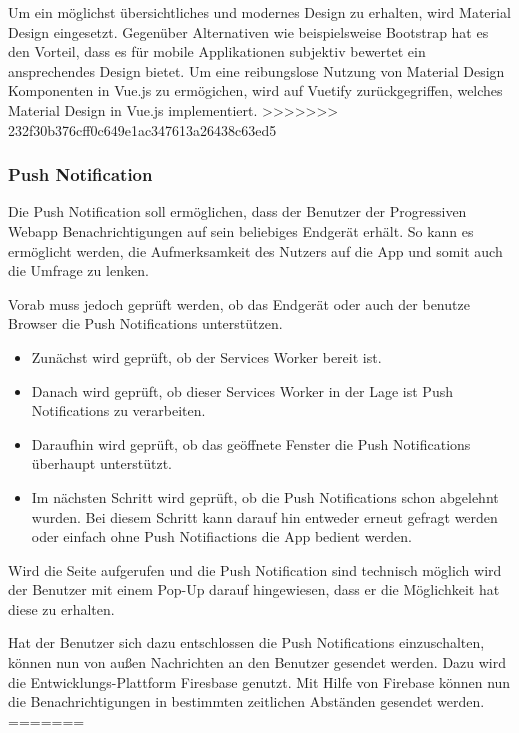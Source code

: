 Um ein möglichst übersichtliches und modernes Design zu erhalten, wird Material Design eingesetzt. Gegenüber Alternativen wie beispielsweise Bootstrap hat es den Vorteil, dass es für mobile Applikationen subjektiv bewertet ein ansprechendes Design bietet. Um eine reibungslose Nutzung von Material Design Komponenten in Vue.js zu ermögichen, wird auf Vuetify zurückgegriffen, welches Material Design in Vue.js implementiert.
>>>>>>> 232f30b376cff0c649e1ac347613a26438c63ed5


\subsubsection{Push Notification}
Die Push Notification soll ermöglichen, dass der Benutzer der Progressiven Webapp Benachrichtigungen auf sein beliebiges Endgerät erhält. So kann es ermöglicht werden, die Aufmerksamkeit des Nutzers auf die App und somit auch die Umfrage zu lenken. 

Vorab muss jedoch geprüft werden, ob das Endgerät oder auch der benutze Browser die Push Notifications unterstützen. 

\begin{itemize}
\item Zunächst wird geprüft, ob der Services Worker bereit ist. 
\item Danach wird geprüft, ob dieser Services Worker in der Lage ist Push Notifications zu verarbeiten.
\item Daraufhin wird geprüft, ob das geöffnete Fenster die Push Notifications überhaupt unterstützt.
\item Im nächsten Schritt wird geprüft, ob die Push Notifications schon abgelehnt wurden. Bei diesem Schritt kann darauf hin entweder erneut gefragt werden oder einfach ohne Push Notifiactions die App bedient werden.
\end{itemize} 

Wird die Seite aufgerufen und die Push Notification sind technisch möglich wird der Benutzer mit einem Pop-Up darauf hingewiesen, dass er die Möglichkeit hat diese zu erhalten. 

Hat der Benutzer sich dazu entschlossen die Push Notifications einzuschalten, können nun von außen Nachrichten an den Benutzer gesendet werden. Dazu wird die Entwicklungs-Plattform Firesbase genutzt. Mit Hilfe von Firebase können nun die Benachrichtigungen in bestimmten zeitlichen Abständen gesendet werden.
=======
